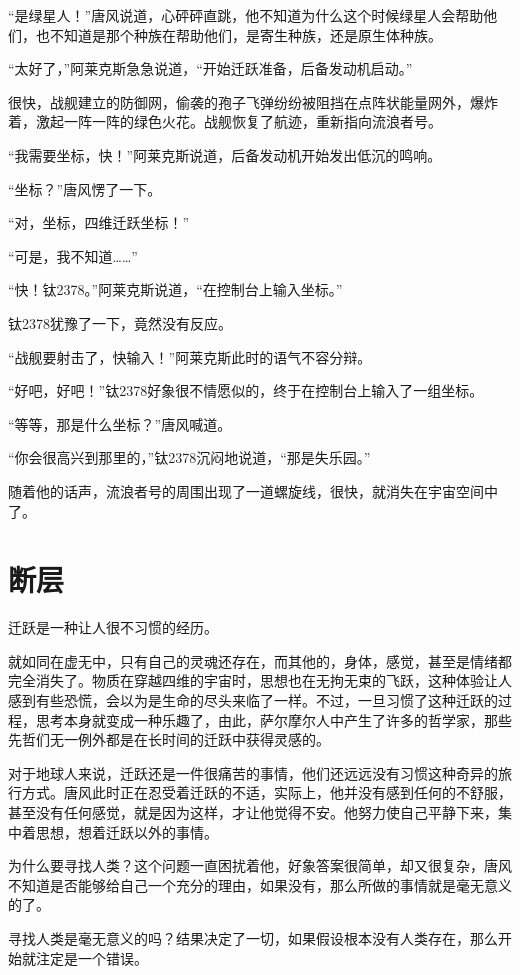 “是绿星人！”唐风说道，心砰砰直跳，他不知道为什么这个时候绿星人会帮助他们，也不知道是那个种族在帮助他们，是寄生种族，还是原生体种族。 

“太好了，”阿莱克斯急急说道，“开始迁跃准备，后备发动机启动。” 

很快，战舰建立的防御网，偷袭的孢子飞弹纷纷被阻挡在点阵状能量网外，爆炸着，激起一阵一阵的绿色火花。战舰恢复了航迹，重新指向流浪者号。 

“我需要坐标，快！”阿莱克斯说道，后备发动机开始发出低沉的鸣响。 

“坐标？”唐风愣了一下。 

“对，坐标，四维迁跃坐标！” 

“可是，我不知道……” 

“快！钛2378。”阿莱克斯说道，“在控制台上输入坐标。” 

钛2378犹豫了一下，竟然没有反应。 

“战舰要射击了，快输入！”阿莱克斯此时的语气不容分辩。 

“好吧，好吧！”钛2378好象很不情愿似的，终于在控制台上输入了一组坐标。 

“等等，那是什么坐标？”唐风喊道。 

“你会很高兴到那里的，”钛2378沉闷地说道，“那是失乐园。” 

随着他的话声，流浪者号的周围出现了一道螺旋线，很快，就消失在宇宙空间中了。 

\chapter{断层}

迁跃是一种让人很不习惯的经历。 

就如同在虚无中，只有自己的灵魂还存在，而其他的，身体，感觉，甚至是情绪都完全消失了。物质在穿越四维的宇宙时，思想也在无拘无束的飞跃，这种体验让人感到有些恐慌，会以为是生命的尽头来临了一样。不过，一旦习惯了这种迁跃的过程，思考本身就变成一种乐趣了，由此，萨尔摩尔人中产生了许多的哲学家，那些先哲们无一例外都是在长时间的迁跃中获得灵感的。 

对于地球人来说，迁跃还是一件很痛苦的事情，他们还远远没有习惯这种奇异的旅行方式。唐风此时正在忍受着迁跃的不适，实际上，他并没有感到任何的不舒服，甚至没有任何感觉，就是因为这样，才让他觉得不安。他努力使自己平静下来，集中着思想，想着迁跃以外的事情。 

为什么要寻找人类？这个问题一直困扰着他，好象答案很简单，却又很复杂，唐风不知道是否能够给自己一个充分的理由，如果没有，那么所做的事情就是毫无意义的了。 

寻找人类是毫无意义的吗？结果决定了一切，如果假设根本没有人类存在，那么开始就注定是一个错误。 

